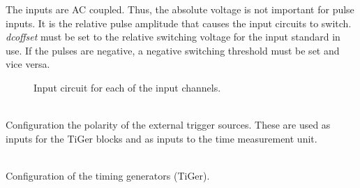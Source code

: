 		\noindent The inputs are AC coupled. Thus, the absolute voltage is not important for pulse inputs. 
		It is the relative pulse amplitude that causes the input circuits to switch. \textit{dc\tu offset} must be set to the relative switching voltage for the input standard in use. If the pulses are negative, a negative switching threshold must be set and vice versa.
	\begin{figure}
		\begin{center}
			\caption{Input circuit for each of the input channels. \label{fig:dcoffset1}}
		\end{center} 
	\end{figure}

	\\
	Configuration the polarity of the external trigger sources.
	These are used as inputs for the TiGer blocks and as inputs to the time measurement unit.\par

	\\
	Configuration of the timing generators (TiGer).

